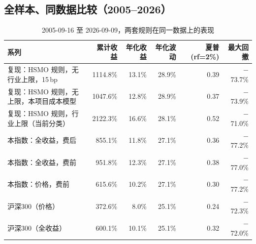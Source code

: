 \documentclass[11pt,a4paper]{article}
\begin{document}
\subsection{全样本、同数据比较（2005--2026）}
\begin{table}[!htbp]
\centering
\footnotesize
\caption{2005-09-16 至 2026-09-09，两套规则在同一数据上的表现}\label{tab:hsmo_full}
\begin{tabular}{@{}lrrrrr@{}}
\toprule
系列 & 累计收益 & 年化收益 & 年化波动 & 夏普 (rf=2\%) & 最大回撤 \\
\midrule
复现：HSMO 规则，无行业上限，15\,bp & 1114.8\% & 13.1\% & 28.9\% & 0.39 & $-$73.7\% \\
复现：HSMO 规则，无上限，本项目成本模型 & 1047.6\% & 12.8\% & 28.9\% & 0.37 & $-$73.9\% \\
复现：HSMO 规则，行业上限（当前分类） & 2122.3\% & 16.6\% & 28.1\% & 0.52 & $-$71.0\% \\
本指数：全收益，费后 & 855.1\% & 11.8\% & 27.1\% & 0.36 & $-$77.2\% \\
本指数：全收益，费前 & 951.8\% & 12.3\% & 27.1\% & 0.38 & $-$77.0\% \\
本指数：价格，费前 & 615.6\% & 10.2\% & 27.1\% & 0.30 & $-$77.2\% \\
沪深300（价格） & 372.6\% & 8.0\% & 25.1\% & 0.24 & $-$72.3\% \\
沪深300（全收益） & 600.1\% & 10.1\% & 25.1\% & 0.32 & $-$72.0\% \\
\bottomrule
\end{tabular}
\end{table}
\end{document}
